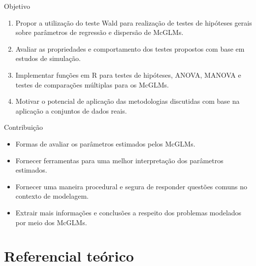 \documentclass[
  ignorenonframetext,
  serif,
  professionalfont,
  usenames,
  dvipsnames,
  aspectratio = 169]{beamer}
\begin{document}
\begin{frame}{Objetivo}
\protect\hypertarget{objetivo}{}
\begin{enumerate}
  \itemsep 2ex
  
 \item Propor a utilização do teste Wald para realização de testes de hipóteses gerais sobre parâmetros de regressão e dispersão de McGLMs.

 \item Avaliar as propriedades e comportamento dos testes propostos com base em estudos de simulação.
 
 \item Implementar funções em R para testes de hipóteses, ANOVA, MANOVA e testes de comparações múltiplas para os McGLMs. 
 
 \item Motivar o potencial de aplicação das metodologias discutidas com base na aplicação a conjuntos de dados reais.

\end{enumerate}
\end{frame}

\begin{frame}{Contribuição}
\protect\hypertarget{contribuiuxe7uxe3o}{}
\begin{itemize}
  \itemsep 2ex
  
  \item Formas de avaliar os parâmetros estimados pelos McGLMs.

  \item Fornecer ferramentas para uma melhor interpretação dos parâmetros estimados.
 
  \item Fornecer uma maneira procedural e segura de responder questões comuns no contexto de modelagem.
 
  \item Extrair mais informações e conclusões a respeito dos problemas modelados por meio dos McGLMs.

\end{itemize}
\end{frame}

\hypertarget{referencial-teuxf3rico}{%
\section{Referencial teórico}\label{referencial-teuxf3rico}}
\end{document}
